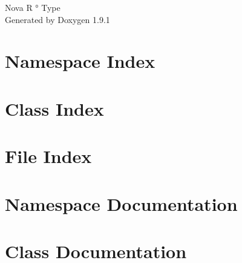 \let\mypdfximage\pdfximage\def\pdfximage{\immediate\mypdfximage}\documentclass[twoside]{book}
\newcommand{\+}{\discretionary{\mbox{\scriptsize$\hookleftarrow$}}{}{}}
\newcommand{\clearemptydoublepage}{%
  \newpage{\pagestyle{empty}\cleardoublepage}%
}
\begin{document}
\raggedbottom

\hypersetup{pageanchor=false,
             bookmarksnumbered=true,
             pdfencoding=unicode
            }
\begin{titlepage}
\vspace*{7cm}
\begin{center}%
{\Large Nova R ° Type }\\
\vspace*{1cm}
{\large Generated by Doxygen 1.9.1}\\
\end{center}
\end{titlepage}
\clearemptydoublepage
{}
\tableofcontents
\clearemptydoublepage
{}
\hypersetup{pageanchor=true}

\chapter{Namespace Index}

\chapter{Class Index}

\chapter{File Index}

\chapter{Namespace Documentation}

\chapter{Class Documentation}

























\end{document}
